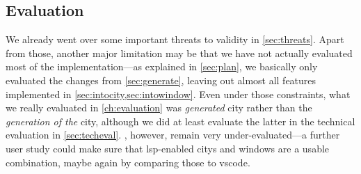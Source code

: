 \documentclass[../thesis]{subfiles}
\begin{document}
\subsection{Evaluation}
We already went over some important threats to validity in \cref{sec:threats}.
Apart from those, another major limitation may be that we have not actually evaluated most of the implementation---as explained in \cref{sec:plan}, we basically only evaluated the changes from \cref{sec:generate}, leaving out almost all features implemented in \cref{sec:intocity,sec:intowindow}.
Even under those constraints, what we really evaluated in \cref{ch:evaluation} was \emph{generated} \gls{city} rather than the \emph{generation of the} \gls{city}, although we did at least evaluate the latter in the technical evaluation in \cref{sec:techeval}.
, however, remain very under-evaluated---a further user study could make sure that \gls{lsp}-enabled \glspl{city} and \glspl{window} are a usable combination, maybe again by comparing those to \gls{vscode}.
\end{document}
